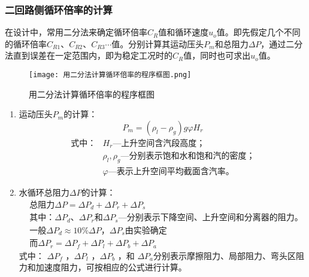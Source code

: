 \subsubsection{二回路侧循环倍率的计算}
在设计中，常用二分法来确定循环倍率$ C_R $值和循环速度$ u_o $值。即先假定几个不同的循环倍率$ C_{R1} $、$ C_{R2} $、$ C_{R3} \cdots$值。分别计算其运动压头$ P_{m} $和总阻力$ \Delta P $，通过二分法直到误差在一定范围内，即为稳定工况时的$ C_{R} $值，同时也可求出$ u_{o} $值。
\begin{figure}[H]
    \centering
    \texttt{[image: 用二分法计算循环倍率的程序框图.png]}
    \caption{用二分法计算循环倍率的程序框图}
    \label{Fig.2}
\end{figure}
\begin{enumerate}
    \item 运动压头$ P_m $的计算：
          \begin{equation*}
              P_{m}=\left(\rho_{l}-\rho_{g}\right) g \varphi H_{r}
          \end{equation*}
          \begin{align*}
              \text{式中：} & H_r \text{—上升空间含汽段高度；}                         \\
                            & \rho_{l},\rho_{g} \text{—分别表示饱和水和饱和汽的密度；} \\
                            & \varphi \text{—表示上升空间平均截面含汽率。}
          \end{align*}
    \item 水循环总阻力$ \Delta P $的计算：
          \begin{align*}
               & \text{总阻力} \Delta P = \Delta P_d + \Delta P_r +\Delta P_s                                                         \\
               & \text{其中：} \Delta P_d \text{、} \Delta P_r \text{和}\Delta P_s \text{—分别表示下降空间、上升空间和分离器的阻力。} \\
               & \text{一般} \Delta P_d \approx 10\% \Delta P \text{，} \Delta P_s 由实验确定                                         \\
               & \text{而} \Delta P_{r}=\Delta P_{f}+\Delta P_{l}+\Delta P_{b}+\Delta P_{a}
          \end{align*}
          式中： $ \Delta P_{f} $ ，$ \Delta P_{l} $ ，$ \Delta P_{b} $ ，和 $ \Delta P_{a} $分别表示摩擦阻力、局部阻力、弯头区阻力和加速度阻力，可按相应的公式进行计算。
\end{enumerate}


